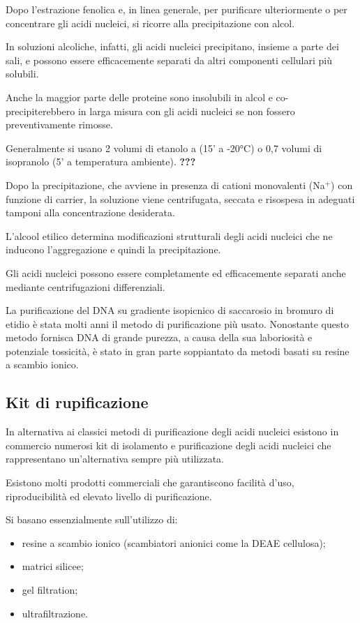 \documentclass[11pt]{book}
\begin{document}
Dopo l'estrazione fenolica e, in linea generale, per purificare
ulteriormente o per concentrare gli acidi nucleici, si ricorre alla
precipitazione con alcol.

In soluzioni alcoliche, infatti, gli acidi nucleici precipitano, insieme
a parte dei sali, e possono essere efficacemente separati da altri
componenti cellulari più solubili.

Anche la maggior parte delle proteine sono insolubili in alcol e co-
precipiterebbero in larga misura con gli acidi nucleici se non fossero
preventivamente rimosse.

Generalmente si usano 2 volumi di etanolo a (15' a -20°C) o 0,7 volumi
di isopranolo (5' a temperatura ambiente). \textbf{???}

Dopo la precipitazione, che avviene in presenza di cationi monovalenti
(Na\(^+\)) con funzione di carrier, la soluzione viene centrifugata,
seccata e risospesa in adeguati tamponi alla concentrazione desiderata.

L'alcool etilico determina modificazioni strutturali degli acidi
nucleici che ne inducono l'aggregazione e quindi la precipitazione.

Gli acidi nucleici possono essere completamente ed efficacemente
separati anche mediante centrifugazioni differenziali.

La purificazione del DNA su gradiente isopicnico di saccarosio in
bromuro di etidio è stata molti anni il metodo di purificazione più
usato. Nonostante questo metodo fornisca DNA di grande purezza, a causa
della sua laboriosità e potenziale tossicità, è stato in gran parte
soppiantato da metodi basati su resine a scambio ionico.

\subsection{Kit di rupificazione}\label{kit-di-rupificazione}

In alternativa ai classici metodi di purificazione degli acidi nucleici
esistono in commercio numerosi kit di isolamento e purificazione degli
acidi nucleici che rappresentano un'alternativa sempre più utilizzata.

Esistono molti prodotti commerciali che garantiscono facilità d'uso,
riproducibilità ed elevato livello di purificazione.

Si basano essenzialmente sull'utilizzo di:

\begin{itemize}
\itemsep1pt\parskip0pt
\item
  resine a scambio ionico (scambiatori anionici come la DEAE cellulosa);
\item
  matrici silicee;
\item
  gel filtration;
\item
  ultrafiltrazione.
\end{itemize}
\end{document}

